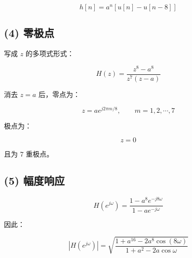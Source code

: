 \documentclass[11pt]{ctexart}
\begin{document}
\[

h[n]=a^n\left[u[n]-u[n-8]\right]

\]



\subsection*{(4) 零极点}



写成 \(z\) 的多项式形式：\par



\[

H(z)=\frac{z^8-a^8}{z^7(z-a)}

\]



消去 \(z=a\) 后，零点为：\par



\[

z=a e^{j2\pi m/8},\qquad m=1,2,\cdots,7

\]



极点为：\par



\[

z=0

\]



且为 \(7\) 重极点。\par



\subsection*{(5) 幅度响应}



\[

H(e^{j\omega})=

\frac{1-a^8e^{-j8\omega}}{1-ae^{-j\omega}}

\]



因此：\par



\[

|H(e^{j\omega})|

=

\sqrt{

\frac{1+a^{16}-2a^8\cos(8\omega)}

{1+a^2-2a\cos\omega}

}

\]
\end{document}
